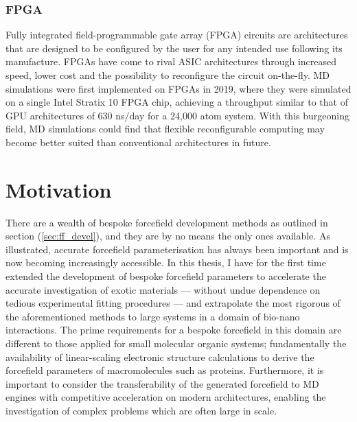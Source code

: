 \subsubsection{FPGA}
Fully integrated field-programmable gate array (FPGA) circuits are architectures that are designed to be configured by the user for any intended use following its manufacture. FPGAs have come to rival ASIC architectures through increased speed, lower cost and the possibility to reconfigure the circuit on-the-fly.\cite{kuon2007measuring} MD simulations were first implemented on FPGAs in 2019, where they were simulated on a single Intel Stratix 10 FPGA chip, achieving a throughput similar to that of GPU architectures of 630 ns/day for a 24,000 atom system.\cite{yang2019fully} With this burgeoning field, MD simulations could find that flexible reconfigurable computing may become better suited than conventional architectures in future. 

\section{Motivation}
There are a wealth of bespoke forcefield development methods as outlined in section (\ref{sec:ff_devel}), and they are by no means the only ones available. As illustrated, accurate forcefield parameterisation has always been important and is now becoming increasingly accessible. In this thesis, I have for the first time extended the development of bespoke forcefield parameters to accelerate the accurate investigation of exotic materials --- without undue dependence on tedious experimental fitting procedures --- and extrapolate the most rigorous of the aforementioned methods to large systems in a domain of bio-nano interactions. The prime requirements for a bespoke forcefield in this domain are different to those applied for small molecular organic systems; fundamentally the availability of linear-scaling electronic structure calculations to derive the forcefield parameters of macromolecules such as proteins. Furthermore, it is important to consider the transferability of the generated forcefield to MD engines with competitive acceleration on modern architectures, enabling the investigation of complex problems which are often large in scale. \\

